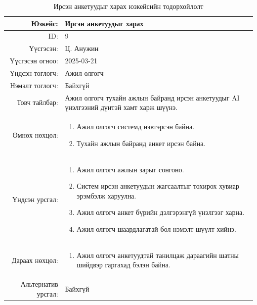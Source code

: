\begin{longtable}{|r|p{11.5cm}|}
    \caption{Ирсэн анкетуудыг харах юзкейсийн тодорхойлолт}
    \label{table:usecase9}\\ \hline
    {Юзкейс:} & {Ирсэн анкетуудыг харах}\\ \hline
    {ID:} & {9}\\ \hline
    {Үүсгэсэн:} & {Ц. Анужин}\\ \hline
    {Үүсгэсэн огноо:} & {2025-03-21}\\ \hline
    {Үндсэн тоглогч:} & {Ажил олгогч}\\ \hline
    {Нэмэлт тоглогч:} & {Байхгүй}\\ \hline
    {Товч тайлбар:} & {Ажил олгогч тухайн ажлын байранд ирсэн анкетуудыг AI үнэлгээний дүнтэй хамт харж шүүнэ.}\\ \hline
    {Өмнөх нөхцөл:} & {\begin{enumerate}[nosep]
        \item Ажил олгогч системд нэвтэрсэн байна.
        \item Тухайн ажлын байранд анкет ирсэн байна.
    \end{enumerate}}\\ \hline
    {Үндсэн урсгал:} & {\begin{enumerate}[nosep]
        \item Ажил олгогч ажлын зарыг сонгоно.
        \item Систем ирсэн анкетуудын жагсаалтыг тохирох хувиар эрэмбэлж харуулна.
        \item Ажил олгогч анкет бүрийн дэлгэрэнгүй үнэлгээг харна.
        \item Ажил олгогч шаардлагатай бол нэмэлт шүүлт хийнэ.
    \end{enumerate}}\\ \hline
    {Дараах нөхцөл:} & {\begin{enumerate}[nosep]
        \item Ажил олгогч анкетуудтай танилцаж дараагийн шатны шийдвэр гаргахад бэлэн байна.
    \end{enumerate}}\\ \hline
    {Альтернатив урсгал:} & {Байхгүй}\\ \hline
\end{longtable}

